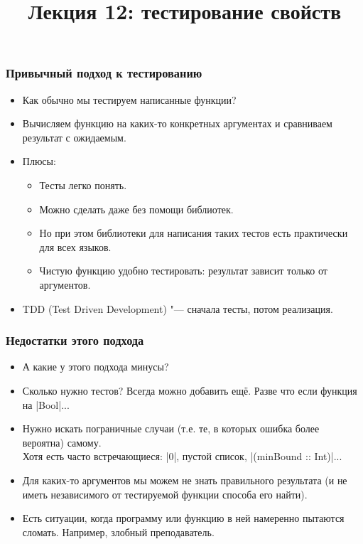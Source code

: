 \documentclass[11pt]{beamer}
\title{Лекция 12: тестирование свойств}
\begin{document}
\begin{frame}[plain]
  \maketitle
\end{frame}

\begin{frame}[fragile]
  \frametitle{Привычный подход к тестированию}
  \begin{itemize}
    \item Как обычно мы тестируем написанные функции?
          \pause
    \item Вычисляем функцию на каких-то конкретных аргументах и сравниваем результат с ожидаемым.
    \item Плюсы:
          \pause
          \begin{itemize}
            \item Тесты легко понять.
            \item Можно сделать даже без помощи библиотек.
            \item Но при этом библиотеки для написания таких тестов есть практически для всех языков.
            \item Чистую функцию удобно тестировать: результат зависит только от аргументов.
          \end{itemize}
          \pause
    \item TDD (Test Driven Development) \pause "--- сначала тесты, потом реализация.
  \end{itemize}
\end{frame}

\begin{frame}[fragile]
  \frametitle{Недостатки этого подхода}
  \begin{itemize}
    \item А какие у этого подхода минусы?
          \pause
    \item Сколько нужно тестов? Всегда можно добавить ещё.
          \pause
          Разве что если функция на \haskinline|Bool|...
          \pause
    \item Нужно искать пограничные случаи (т.е. те, в которых ошибка более вероятна) самому. \\
          Хотя есть часто встречающиеся: \pause \haskinline|0|, пустой список, \haskinline|(minBound :: Int)|...
          \pause
    \item Для каких-то аргументов мы можем не знать правильного результата (и не иметь независимого от тестируемой функции способа его найти).
          \pause
    \item Есть ситуации, когда программу или функцию в ней намеренно пытаются сломать. \pause Например, злобный преподаватель.
  \end{itemize}
\end{frame}
\end{document}
